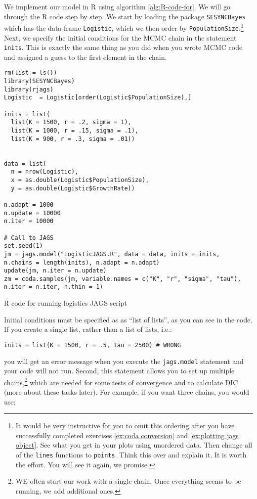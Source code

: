 \documentclass[12pt,english]{article}
\begin{document}
We implement our model in R using algorithm \ref{alg:R-code-for}. We will go through the R code step by step. We start by loading the package \texttt{SESYNCBayes} which has the data frame \texttt{Logistic}, which we then order by \texttt{PopulationSize}.\footnote{It would be very instructive for you to omit this ordering after you have successfully completed exercises \ref{ex:coda conversion} and \ref{ex:plotting jags object}. See what you get in your plots using unordered data. Then change all of the \texttt{lines} functions to \texttt{points}. Think this over and explain it. It is worth the effort. You will see it again, we promise.} Next, we specify the initial conditions for the MCMC chain in the statement \texttt{inits}. This is exactly the same thing as you did when you wrote MCMC code and assigned a guess to the first element in the chain. 

\begin{algorithm}
\begin{Verbatim}[frame=single]
rm(list = ls())
library(SESYNCBayes)
library(rjags)
Logistic  = Logistic[order(Logistic$PopulationSize),]

inits = list(
  list(K = 1500, r = .2, sigma = 1),
  list(K = 1000, r = .15, sigma = .1),
  list(K = 900, r = .3, sigma = .01))


data = list(
  n = nrow(Logistic),
  x = as.double(Logistic$PopulationSize),
  y = as.double(Logistic$GrowthRate))

n.adapt = 1000
n.update = 10000
n.iter = 10000

# Call to JAGS
set.seed(1)
jm = jags.model("LogisticJAGS.R", data = data, inits = inits, 
n.chains = length(inits), n.adapt = n.adapt)
update(jm, n.iter = n.update)
zm = coda.samples(jm, variable.names = c("K", "r", "sigma", "tau"),
n.iter = n.iter, n.thin = 1)
\end{Verbatim}
\caption{R code for running logistics JAGS script}
\label{alg:R-code-for}
\end{algorithm}

Initial conditions must be specified as as \enquote{list of lists}, as you can see in the code. If you create a single list, rather than a list of lists, i.e.:

\begin{Verbatim}
inits = list(K = 1500, r = .5, tau = 2500) # WRONG
\end{Verbatim}

\noindent you will get an error message when you execute the \texttt{jags.model} statement and your code will not run. Second, this statement allows you to set up multiple chains,\footnote{WE often start our work with a single chain. Once everything seems to be running, we add additional ones.} which are needed for some tests of convergence and to calculate DIC (more about these tasks later). For example, if you want three chains, you would use:
\end{document}
